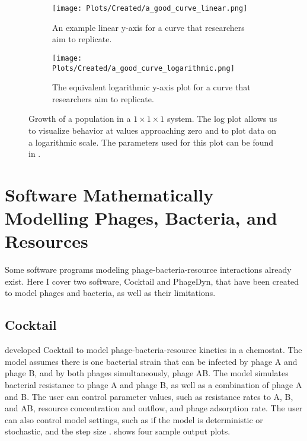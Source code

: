 \begin{figure}[h!]
    \centering
    \begin{subfigure}{1\linewidth}
        \centering
        \captionsetup{width=1\linewidth}
        \texttt{[image: Plots/Created/a\_good\_curve\_linear.png]}
        \caption{
            An example linear y-axis for a curve that researchers aim to replicate. 
        }
        \label{fig:created:a_good_curve_linear}
    \end{subfigure}
    \hfill
    \begin{subfigure}{1\linewidth}
        \centering
        \captionsetup{width=1\linewidth}
        \texttt{[image: Plots/Created/a\_good\_curve\_logarithmic.png]}
        \caption{
            The equivalent logarithmic y-axis plot for a curve that researchers aim to replicate. 
        }
        \label{fig:created:a_good_curve_logarithmic}
    \end{subfigure}
    \caption{
        Growth of a population in a $1\times1\times1$ system. 
        The log plot allows us to visualize behavior at values approaching zero and to plot data on a logarithmic scale. 
        The parameters used for this plot can be found in . 
    }
    \label{fig:created:a_good_curve}
\end{figure}

\section{Software Mathematically Modelling Phages, Bacteria, and Resources}
Some software programs modeling phage-bacteria-resource interactions already exist. 
Here I cover two software, Cocktail and PhageDyn, that have been created to model phages and bacteria, as well as their limitations. 

\subsection{Cocktail}
\citet{nilssonCocktailComputerProgram2022} developed Cocktail to model phage-bacteria-resource kinetics in a chemostat. 
The model assumes there is one bacterial strain that can be infected by phage A and phage B, and by both phages simultaneously, phage AB. 
The model simulates bacterial resistance to phage A and phage B, as well as a combination of phage A and B. 
The user can control parameter values, such as resistance rates to A, B, and AB, resource concentration and outflow, and phage adsorption rate. 
The user can also control model settings, such as if the model is deterministic or stochastic, and the step size \cite{nilssonCocktailComputerProgram2022}. 
 shows four sample output plots. 

